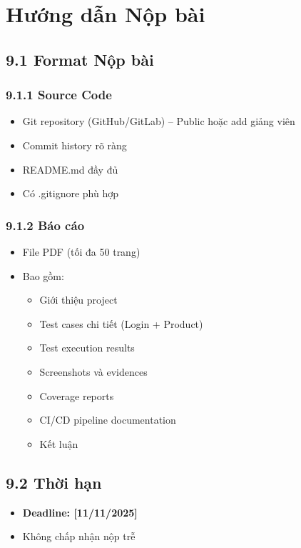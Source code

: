 \documentclass[a4paper,12pt]{article}
\begin{document}
\section{Hướng dẫn Nộp bài}

\subsection{9.1 Format Nộp bài}

\subsubsection{9.1.1 Source Code}

\begin{itemize}
    \item Git repository (GitHub/GitLab) – Public hoặc add giảng viên
    \item Commit history rõ ràng
    \item README.md đầy đủ
    \item Có .gitignore phù hợp
\end{itemize}

\subsubsection{9.1.2 Báo cáo}

\begin{itemize}
    \item File PDF (tối đa 50 trang)
    \item Bao gồm:
    \begin{itemize}
        \item Giới thiệu project
        \item Test cases chi tiết (Login + Product)
        \item Test execution results
        \item Screenshots và evidences
        \item Coverage reports
        \item CI/CD pipeline documentation
        \item Kết luận
    \end{itemize}
\end{itemize}

\subsection{9.2 Thời hạn}

\begin{itemize}
    \item \textbf{Deadline: [11/11/2025]}
    \item Không chấp nhận nộp trễ
\end{itemize}
\end{document}
